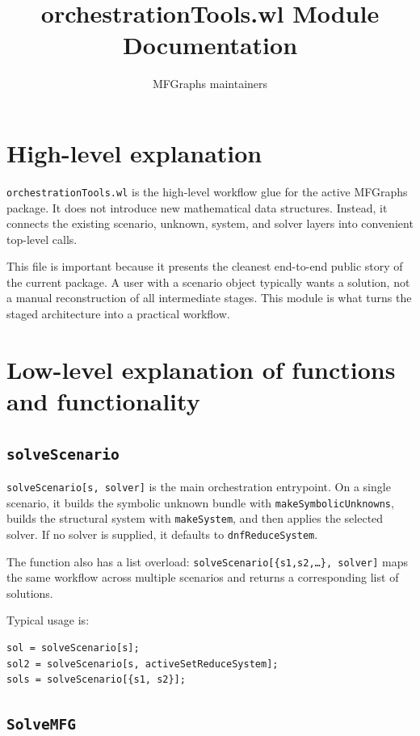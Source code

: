 \documentclass[11pt]{article}
\title{orchestrationTools.wl Module Documentation}
\author{MFGraphs maintainers}
\date{}
\begin{document}
\maketitle

\section{High-level explanation}

\texttt{orchestrationTools.wl} is the high-level workflow glue for the active MFGraphs package. It does not introduce new mathematical data structures. Instead, it connects the existing scenario, unknown, system, and solver layers into convenient top-level calls.

This file is important because it presents the cleanest end-to-end public story of the current package. A user with a scenario object typically wants a solution, not a manual reconstruction of all intermediate stages. This module is what turns the staged architecture into a practical workflow.

\section{Low-level explanation of functions and functionality}

\subsection*{\texttt{solveScenario}}

\texttt{solveScenario[s, solver]} is the main orchestration entrypoint. On a single scenario, it builds the symbolic unknown bundle with \texttt{makeSymbolicUnknowns}, builds the structural system with \texttt{makeSystem}, and then applies the selected solver. If no solver is supplied, it defaults to \texttt{dnfReduceSystem}.

The function also has a list overload: \texttt{solveScenario[\{s1,s2,\ldots\}, solver]} maps the same workflow across multiple scenarios and returns a corresponding list of solutions.

Typical usage is:

\begin{verbatim}
sol = solveScenario[s];
sol2 = solveScenario[s, activeSetReduceSystem];
sols = solveScenario[{s1, s2}];
\end{verbatim}

\subsection*{\texttt{SolveMFG}}
\end{document}
